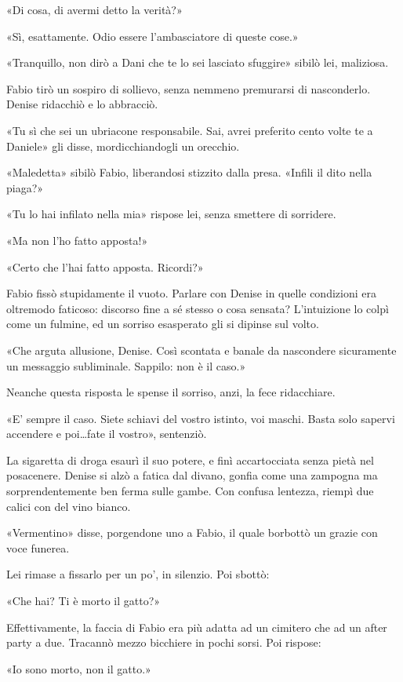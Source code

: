 «Di cosa, di avermi detto la verità?»

«Sì, esattamente. Odio essere l'ambasciatore di queste cose.»

«Tranquillo, non dirò a Dani che te lo sei lasciato sfuggire» sibilò lei, maliziosa.

Fabio tirò un sospiro di sollievo, senza nemmeno premurarsi di nasconderlo. Denise ridacchiò e lo abbracciò.

«Tu sì che sei un ubriacone responsabile. Sai, avrei preferito cento volte te a Daniele» gli disse, mordicchiandogli un orecchio.

«Maledetta» sibilò Fabio, liberandosi stizzito dalla presa. «Infili il dito nella piaga?»

«Tu lo hai infilato nella mia» rispose lei, senza smettere di sorridere.

«Ma non l'ho fatto apposta!»

«Certo che l'hai fatto apposta. Ricordi?»

Fabio fissò stupidamente il vuoto. Parlare con Denise in quelle condizioni era oltremodo faticoso: discorso fine a sé stesso o cosa sensata? L'intuizione lo colpì come un fulmine, ed un sorriso esasperato gli si dipinse sul volto.

«Che arguta allusione, Denise. Così scontata e banale da nascondere sicuramente un messaggio subliminale. Sappilo: non è il caso.»

Neanche questa risposta le spense il sorriso, anzi, la fece ridacchiare.

«E' sempre il caso. Siete schiavi del vostro istinto, voi maschi. Basta solo sapervi accendere e poi\ldots fate il vostro», sentenziò.

La sigaretta di droga esaurì il suo potere, e finì accartocciata senza pietà nel posacenere. Denise si alzò a fatica dal divano, gonfia come una zampogna ma sorprendentemente ben ferma sulle gambe. Con confusa lentezza, riempì due calici con del vino bianco.

«Vermentino» disse, porgendone uno a Fabio, il quale borbottò un grazie con voce funerea.

Lei rimase a fissarlo per un po', in silenzio. Poi sbottò:

«Che hai? Ti è morto il gatto?»

Effettivamente, la faccia di Fabio era più adatta ad un cimitero che ad un after party a due. Tracannò mezzo bicchiere in pochi sorsi. Poi rispose:

«Io sono morto, non il gatto.»

